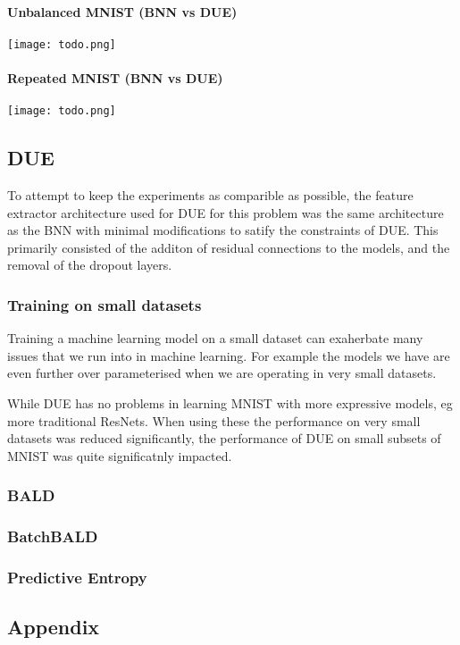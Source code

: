 \documentclass[12pt, a4paper]{report}
\theoremstyle{definition}
\theoremstyle{definition}
\theoremstyle{definition}
\begin{document}
\subsubsection{Unbalanced MNIST (BNN vs DUE)}

\texttt{[image: todo.png]}

\subsubsection{Repeated MNIST (BNN vs DUE)}

\texttt{[image: todo.png]}

\section{DUE}

To attempt to keep the experiments as comparible as possible, the feature extractor architecture used for DUE for this problem was the same architecture as the BNN with minimal modifications to satify the constraints of DUE. This primarily consisted of the additon of residual connections to the models, and the removal of the dropout layers.


\subsection{Training on small datasets}

Training a machine learning model on a small dataset can exaherbate many issues that we run into in machine learning. For example the models we have are even further over parameterised when we are operating in very small datasets.

While DUE has no problems in learning MNIST with more expressive models, eg more traditional ResNets. When using these the performance on very small datasets was reduced significantly, the performance of DUE on small subsets of MNIST was quite significatnly impacted.


\subsection{BALD}

\subsection{BatchBALD}

\subsection{Predictive Entropy}






\renewcommand{\bibname}{Bibliography}



\begin{appendices}
\chapter{Appendix}

\end{appendices}
\end{document}
